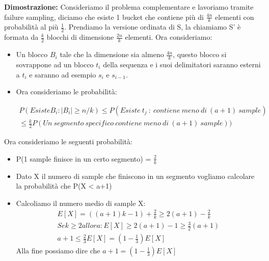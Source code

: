 \documentclass[12pt]{article}
\begin{document}
\textbf{Dimostrazione:} Consideriamo il problema complementare e lavoriamo tramite failure sampling, diciamo che esiste 1 bucket che contiene più di $\frac{4n}{k}$ elementi con probabilità al più $\frac{1}{2}$.
Prendiamo la versione ordinata di S, la chiamiamo S' è formata da $\frac{k}{2}$ blocchi di dimensione $\frac{2n}{k}$ elementi.
Ora consideriamo:
\begin{itemize}
    \item Un blocco $B_i$ tale che la dimensione sia almeno $\frac{4n}{k}$, questo blocco si sovrappone ad un blocco $t_i$ della sequenza e i suoi delimitatori saranno esterni a $t_i$ e saranno ad esempio $s_i$ e $s_{i-1}$.
    \item Ora consideriamo le probabilità:
        
        \begin{equation*}
        \label{eq:pareto mle2}
            \begin{multlined}
            P(Esiste B_i : |B_i| \geq n/k) \leq P(Esiste\ t_j\ :\ contiene\ meno\ di\ (a+1)\ sample) \\
            \leq \frac{k}{2} P(Un\ segmento\ specifico\ contiene\ meno\ di\ (a+1)\ sample))
            \end{multlined}
            \end{equation*}
   
\end{itemize}
Ora consideriamo le seguenti probabilità:
\begin{itemize}
    \item P(1 sample finisce in un certo segmento) = $\frac{2}{k}$
    \item Dato X il numero di sample che finiscono in un segmento vogliamo calcolare la probabilità che P(X < a+1)
    \item Calcoliamo il numero medio di sample X: 
           \begin{equation*}
        \label{eq:pareto mle2}
            \begin{multlined}
            E[X] = ((a+1)k-1)+\frac{2}{k} \geq 2(a+1) - \frac{2}{k} \\
            Se k \geq 2 allora:
            E[X] \geq 2(a+1) - 1 \geq \frac{3}{2}(a+1) \\
            a+1 \leq \frac{2}{3}E[X] = (1- \frac{1}{3})E[X]
            \end{multlined}
            \end{equation*}
            Alla fine possiamo dire che $a+1 = (1- \frac{1}{3})E[X]$
\end{itemize}
\end{document}
